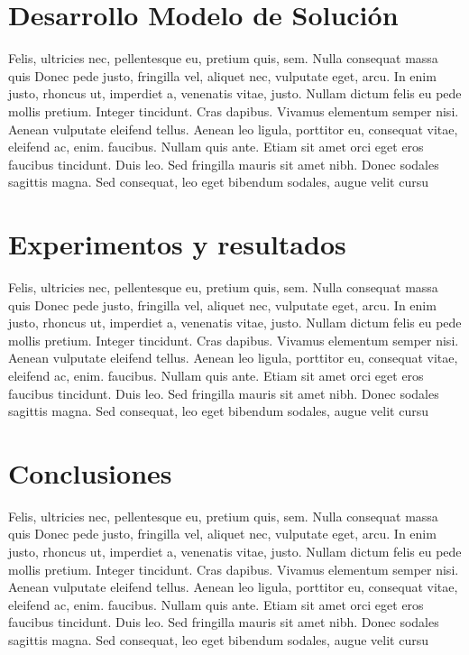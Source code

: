 \documentclass{article}
\begin{document}
\section{Desarrollo Modelo de Solución}

Felis, ultricies nec, pellentesque eu, pretium quis, sem. Nulla consequat massa quis Donec pede justo, fringilla vel, aliquet nec, vulputate eget, arcu. In enim justo, rhoncus ut, imperdiet a, venenatis vitae, justo. Nullam dictum felis eu pede mollis pretium. Integer tincidunt. Cras dapibus. Vivamus elementum semper nisi. Aenean vulputate eleifend tellus. Aenean leo ligula, porttitor eu, consequat vitae, eleifend ac, enim. faucibus. Nullam quis ante. Etiam sit amet orci eget eros faucibus tincidunt. Duis leo. Sed fringilla mauris sit amet nibh. Donec sodales sagittis magna. Sed consequat, leo eget bibendum sodales, augue velit cursu

\section{Experimentos y resultados}

Felis, ultricies nec, pellentesque eu, pretium quis, sem. Nulla consequat massa quis Donec pede justo, fringilla vel, aliquet nec, vulputate eget, arcu. In enim justo, rhoncus ut, imperdiet a, venenatis vitae, justo. Nullam dictum felis eu pede mollis pretium. Integer tincidunt. Cras dapibus. Vivamus elementum semper nisi. Aenean vulputate eleifend tellus. Aenean leo ligula, porttitor eu, consequat vitae, eleifend ac, enim. faucibus. Nullam quis ante. Etiam sit amet orci eget eros faucibus tincidunt. Duis leo. Sed fringilla mauris sit amet nibh. Donec sodales sagittis magna. Sed consequat, leo eget bibendum sodales, augue velit cursu


\section{Conclusiones}

Felis, ultricies nec, pellentesque eu, pretium quis, sem. Nulla consequat massa quis Donec pede justo, fringilla vel, aliquet nec, vulputate eget, arcu. In enim justo, rhoncus ut, imperdiet a, venenatis vitae, justo. Nullam dictum felis eu pede mollis pretium. Integer tincidunt. Cras dapibus. Vivamus elementum semper nisi. Aenean vulputate eleifend tellus. Aenean leo ligula, porttitor eu, consequat vitae, eleifend ac, enim. faucibus. Nullam quis ante. Etiam sit amet orci eget eros faucibus tincidunt. Duis leo. Sed fringilla mauris sit amet nibh. Donec sodales sagittis magna. Sed consequat, leo eget bibendum sodales, augue velit cursu
\end{document}

